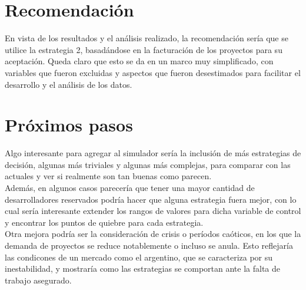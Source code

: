 \section{Recomendación}

En vista de los resultados y el análisis realizado, la recomendación sería que se utilice la estrategia 2, basadándose en la facturación de los proyectos para su aceptación.
Queda claro que esto se da en un marco muy simplificado, con variables que fueron excluidas y aspectos que fueron desestimados para facilitar el desarrollo y el análisis de los
datos.\\

\section{Próximos pasos}

Algo interesante para agregar al simulador sería la inclusión de más estrategias de decisión, algunas más triviales y algunas más complejas, para comparar 
con las actuales y ver si realmente son tan buenas como parecen. \\

Además, en algunos casos parecería que tener una mayor cantidad de desarrolladores reservados podría hacer que alguna estrategia fuera mejor, con lo cual sería interesante
extender los rangos de valores para dicha variable de control y encontrar los puntos de quiebre para cada estrategia.\\

Otra mejora podría ser la consideración de crisis o períodos caóticos, en los que la demanda de proyectos se reduce notablemente o 
incluso se anula. Esto reflejaría las condicones de un mercado como el argentino, que se caracteriza por su inestabilidad, y mostraría como las 
estrategias se comportan ante la falta de trabajo asegurado.\\



